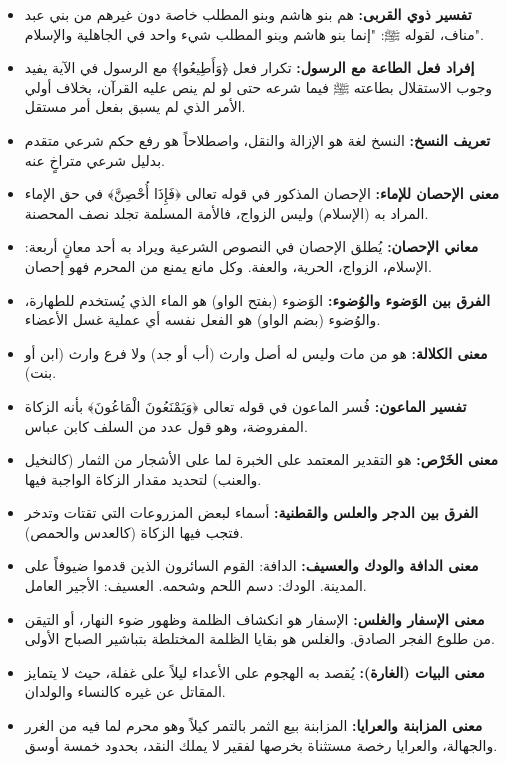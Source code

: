 \begin{itemize}
    \item \textbf{تفسير ذوي القربى:} هم بنو هاشم وبنو المطلب خاصة دون غيرهم من بني عبد مناف، لقوله ﷺ: "إنما بنو هاشم وبنو المطلب شيء واحد في الجاهلية والإسلام".
    \item \textbf{إفراد فعل الطاعة مع الرسول:} تكرار فعل ﴿وَأَطِيعُوا﴾ مع الرسول في الآية يفيد وجوب الاستقلال بطاعته ﷺ فيما شرعه حتى لو لم ينص عليه القرآن، بخلاف أولي الأمر الذي لم يسبق بفعل أمر مستقل.
    \item \textbf{تعريف النسخ:} النسخ لغة هو الإزالة والنقل، واصطلاحاً هو رفع حكم شرعي متقدم بدليل شرعي متراخٍ عنه.
    \item \textbf{معنى الإحصان للإماء:} الإحصان المذكور في قوله تعالى ﴿فَإِذَا أُحْصِنَّ﴾ في حق الإماء المراد به (الإسلام) وليس الزواج، فالأمة المسلمة تجلد نصف المحصنة.
    \item \textbf{معاني الإحصان:} يُطلق الإحصان في النصوص الشرعية ويراد به أحد معانٍ أربعة: الإسلام، الزواج، الحرية، والعفة. وكل مانع يمنع من المحرم فهو إحصان.
    \item \textbf{الفرق بين الوَضوء والوُضوء:} الوَضوء (بفتح الواو) هو الماء الذي يُستخدم للطهارة، والوُضوء (بضم الواو) هو الفعل نفسه أي عملية غسل الأعضاء.
    \item \textbf{معنى الكلالة:} هو من مات وليس له أصل وارث (أب أو جد) ولا فرع وارث (ابن أو بنت).
    \item \textbf{تفسير الماعون:} فُسر الماعون في قوله تعالى ﴿وَيَمْنَعُونَ الْمَاعُونَ﴾ بأنه الزكاة المفروضة، وهو قول عدد من السلف كابن عباس.
    \item \textbf{معنى الخَرْص:} هو التقدير المعتمد على الخبرة لما على الأشجار من الثمار (كالنخيل والعنب) لتحديد مقدار الزكاة الواجبة فيها.
    \item \textbf{الفرق بين الدجر والعلس والقطنية:} أسماء لبعض المزروعات التي تقتات وتدخر فتجب فيها الزكاة (كالعدس والحمص).
    \item \textbf{معنى الدافة والودك والعسيف:} الدافة: القوم السائرون الذين قدموا ضيوفاً على المدينة. الودك: دسم اللحم وشحمه. العسيف: الأجير العامل.
    \item \textbf{معنى الإسفار والغلس:} الإسفار هو انكشاف الظلمة وظهور ضوء النهار، أو التيقن من طلوع الفجر الصادق. والغلس هو بقايا الظلمة المختلطة بتباشير الصباح الأولى.
    \item \textbf{معنى البيات (الغارة):} يُقصد به الهجوم على الأعداء ليلاً على غفلة، حيث لا يتمايز المقاتل عن غيره كالنساء والولدان.
    \item \textbf{معنى المزابنة والعرايا:} المزابنة بيع الثمر بالتمر كيلاً وهو محرم لما فيه من الغرر والجهالة، والعرايا رخصة مستثناة بخرصها لفقير لا يملك النقد، بحدود خمسة أوسق.

\end{itemize}
